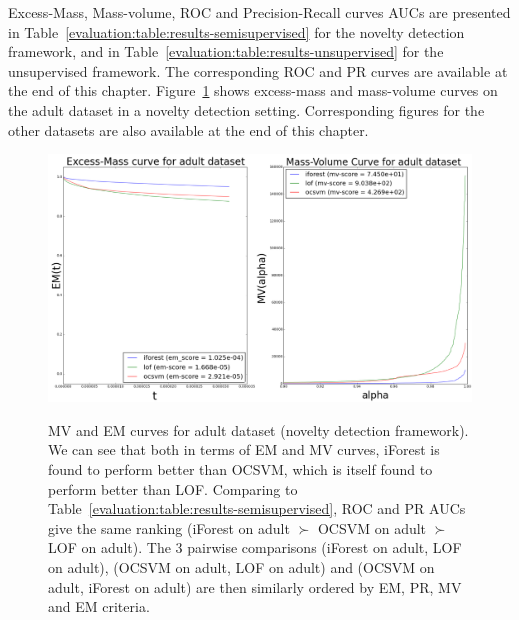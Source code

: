 Excess-Mass, Mass-volume, ROC and Precision-Recall curves AUCs are presented in Table~\ref{evaluation:table:results-semisupervised} for the novelty detection framework, and in Table~\ref{evaluation:table:results-unsupervised} for the unsupervised framework. The corresponding ROC and PR curves are available at the end of this chapter. %
%
Figure~\ref{evaluation:mv_em_adult} shows excess-mass and mass-volume curves on the adult dataset in a novelty detection setting. %
Corresponding figures for the other datasets are also available at the end of this chapter.

\begin{figure}[!ht]
  \centering
  \caption{MV and EM curves for adult dataset (novelty detection framework). We can see that both in terms of EM and MV curves, iForest is found to perform better than OCSVM, which is itself found to perform better than LOF. Comparing to Table~\ref{evaluation:table:results-semisupervised}, ROC and PR AUCs give the same ranking (iForest on adult $\succ$ OCSVM on adult $\succ$ LOF on adult). The 3 pairwise comparisons (iForest on adult, LOF on adult), (OCSVM on adult, LOF on adult) and (OCSVM on adult, iForest on adult) are then similarly ordered by EM, PR, MV and EM criteria.}
  \includegraphics[width=\linewidth]{fig_source/evaluation_fig/mv_em_adult_supervised_09_factorized_inkscape.png}
\label{evaluation:mv_em_adult}
\end{figure}


